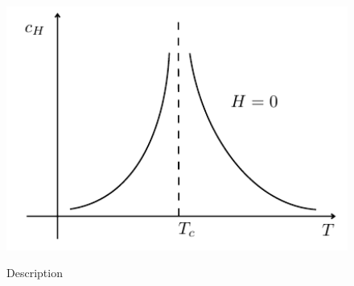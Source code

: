 \documentclass[../main/main.tex]{subfiles}
\begin{document}
\begin{figure}[h!]
\begin{minipage}[c]{0.5\linewidth}
{\includegraphics[width=1\textwidth]{../lessons/3_image/12.pdf}
    \label{fig:3_4_3} }
\end{minipage}
\begin{minipage}[]{0.5\linewidth}
\centering
{}
\end{minipage}
\caption{\label{fig:} Description}
\end{figure}
\end{document}
